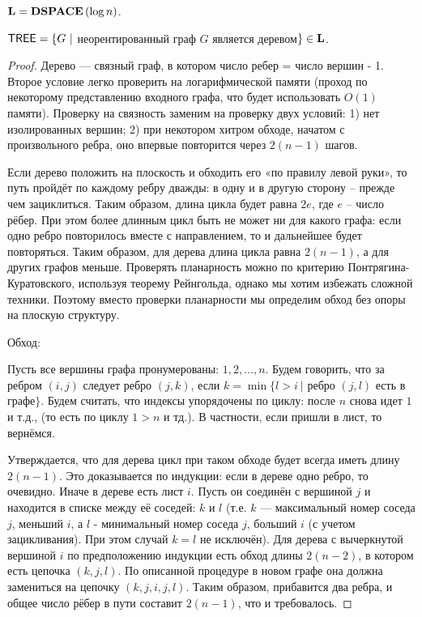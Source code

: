 \begin{definition} 
    $\textbf{L} = \textbf{DSPACE}\left({\log n}\right)$.
\end{definition}

\begin{theorem} 
    $\mathsf{TREE} = \{ G\ |$ неорентированный граф $G$ является деревом$\} \in \textbf{L}$.
\end{theorem}

\begin{proof}
    Дерево — связный граф, в котором число ребер = число вершин - 1. Второе условие легко проверить на логарифмической памяти (проход по некоторому представлению входного графа, что будет использовать $O(1)$ памяти). Проверку на связность заменим на проверку двух условий: 1) нет изолированных вершин; 2) при некотором хитром обходе, начатом с произвольного ребра, оно впервые повторится через $2(n - 1)$ шагов.

    Если дерево положить на плоскость и обходить его «по правилу левой руки», то путь пройдёт по каждому ребру дважды: в одну и в другую сторону -- прежде чем зациклиться. Таким образом, длина цикла будет равна $2e$, где $e$ -- число рёбер. При этом более длинным цикл быть не может ни для какого графа: если одно ребро повторилось вместе с направлением, то и дальнейшее будет повторяться. Таким образом, для дерева длина цикла равна $2(n - 1)$, а для других графов меньше. Проверять планарность можно по критерию Понтрягина-Куратовского, используя теорему Рейнгольда, однако мы хотим избежать сложной техники. Поэтому вместо проверки планарности мы определим обход без опоры на плоскую структуру.

    Обход:
    
    Пусть все вершины графа пронумерованы: $1, 2, ..., n$.
    Будем говорить, что за ребром $(i, j)$ следует ребро $(j, k)$, если $k = \min\{ l > i\ | $ ребро $(j,l)$ есть в графе$\}$. 
    Будем считать, что индексы упорядочены по циклу: после $n$ снова идет $1$ и т.д., (то есть по циклу $1 > n$ и тд.). В частности, если пришли в лист, то вернёмся.
    
    Утверждается, что для дерева цикл при таком обходе будет всегда иметь длину $2(n - 1)$. Это доказывается по индукции: если в дереве одно ребро, то очевидно. Иначе в дереве есть лист $i$. Пусть он соединён с вершиной $j$ и находится в списке между её соседей: $k$ и $l$ (т.е. $k$ — максимальный номер соседа $j$, меньший $i$, а $l$ - минимальный номер соседа $j$, больший $i$ (с учетом зацикливания). При этом случай $k = l$ не исключён). Для дерева с вычеркнутой вершиной $i$ по предположению индукции есть обход длины $2(n - 2)$, в котором есть цепочка $(k, j, l)$. По описанной процедуре в новом графе она должна замениться на цепочку $(k, j, i, j, l)$. Таким образом, прибавится два ребра, и общее число рёбер в пути составит $2(n - 1)$, что и требовалось.
    

\end{proof}
